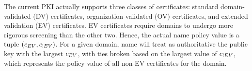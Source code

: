 The current PKI actually supports three classes of certificates: standard
domain-validated (DV) certificates, organization-validated (OV) certificates,
and extended validation (EV) certificates. EV certificates require domains to
undergo more rigorous screening than the other two.
Hence, the actual \ac{name} policy value is a tuple $(c_{EV},
c_{!EV})$. For a given domain, \ac{name} will treat as authoritative the
public key with the largest $c_{EV}$, with ties broken based on the
largest value of $c_{!EV}$, which represents the policy value of all
non-EV certificates for the domain.





